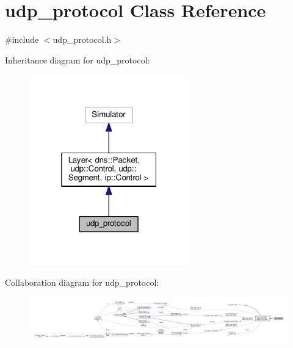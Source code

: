\hypertarget{classudp__protocol}{}\section{udp\+\_\+protocol Class Reference}
\label{classudp__protocol}


{\ttfamily \#include $<$udp\+\_\+protocol.\+h$>$}



Inheritance diagram for udp\+\_\+protocol\+:\nopagebreak
\begin{figure}[H]
\begin{center}
\leavevmode
\includegraphics[width=196pt]{classudp__protocol__inherit__graph}
\end{center}
\end{figure}


Collaboration diagram for udp\+\_\+protocol\+:\nopagebreak
\begin{figure}[H]
\begin{center}
\leavevmode
\includegraphics[width=350pt]{classudp__protocol__coll__graph}
\end{center}
\end{figure}
